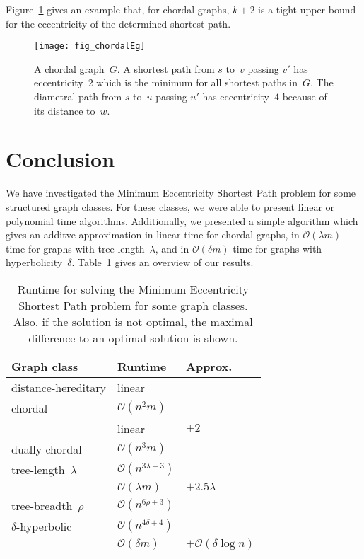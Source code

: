 \documentclass[10pt]{llncs}
\newcommand{\calO}{\mathcal{O}}
\begin{document}
Figure~\ref{fig:chordalEg} gives an example that, for chordal graphs, $k + 2$ is a tight upper bound for the eccentricity of the determined shortest path.

\begin{figure}
    [htb]
    \centering
    \texttt{[image: fig\_chordalEg]}\caption
    {
        A chordal graph~$G$.
        A shortest path from $s$ to~$v$ passing $v'$ has eccentricity~$2$ which is the minimum for all shortest paths in~$G$.
        The diametral path from $s$ to~$u$ passing $u'$ has eccentricity~$4$ because of its distance to~$w$.
    }
    \label{fig:chordalEg}
\end{figure}

\section{Conclusion}

We have investigated the Minimum Eccentricity Shortest Path problem for some structured graph classes.
For these classes, we were able to present linear or polynomial time algorithms.
Additionally, we presented a simple algorithm which gives an additve approximation in linear time for chordal graphs, in $\calO(\lambda m)$ time for graphs with tree-length~$\lambda$, and in $\calO(\delta m)$ time for graphs with hyperbolicity~$\delta$.
Table~\ref{tbl:Results} gives an overview of our results.

\begin{table}
    [htb]
    \caption
    {Runtime for solving the Minimum Eccentricity Shortest Path problem for some graph classes. Also, if the solution is not optimal, the maximal difference to an optimal solution is shown.
    }
    \label{tbl:Results}
    \centering
    \begin{tabular}{@{\quad}l@{\quad}||@{\quad}l@{\quad}@{\quad}||@{\quad}l@{\quad}}
        Graph class & Runtime & Approx. \\
        \hline
        \hline
        distance-hereditary & linear \\
        \hline
        chordal & $\calO(n^2m)$ \\
                & linear & $+ 2$ \\
        \hline
        dually chordal & $\calO(n^3m)$ \\
        \hline
        tree-length~$\lambda$ & $\calO(n^{3\lambda+3})$ \\
                              & $\calO(\lambda m)$  & $+ 2.5 \lambda$ \\
        \hline
        tree-breadth~$\rho$ & $\calO(n^{6\rho+3})$ \\
        \hline
        $\delta$-hyperbolic & $\calO(n^{4\delta+4})$ \\
                            & $\calO(\delta m)$ & $+ \calO(\delta \log n)$\\
    \end{tabular}

\end{table}
\end{document}
